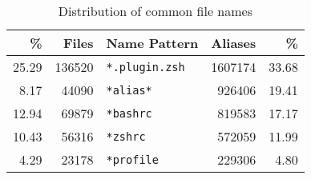 \begin{table}
	\caption{Distribution of common file names}
	\label{tab:file-names}
	\begin{tabular}{rrlrr}
		\toprule
		\% &          Files &        Name Pattern &         Aliases &           \% \\
		\midrule
		\num{25.29} &  \num{136520}  & \verb|*.plugin.zsh| &  \num{1607174}  &  \num{33.68} \\
		\num{8.17} &   \num{44090}  &      \verb|*alias*| &   \num{926406}  &  \num{19.41} \\
		\num{12.94} &   \num{69879}  &      \verb|*bashrc| &   \num{819583}  &  \num{17.17} \\
		\num{10.43} &   \num{56316}  &       \verb|*zshrc| &   \num{572059}  &  \num{11.99} \\
		\num{4.29} &   \num{23178}  &     \verb|*profile| &   \num{229306}  &   \num{4.80} \\
		\bottomrule
	\end{tabular}
\end{table}